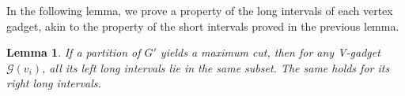 \documentclass[11pt]{article}
\newtheorem{lemma}{Lemma}
\begin{document}
% 
% 
% 
% 
% 

In the following lemma, we prove a property of the long intervals of each vertex gadget, akin to the property of the short intervals proved in the previous lemma.

\begin{lemma} \label{lem2}
If a partition of $G'$ yields a maximum cut, then for any V-gadget $\mathcal{G}(v_i)$, all its left long intervals lie in the same subset. The same holds for its right long intervals.
% 
\end{lemma}
\end{document}
